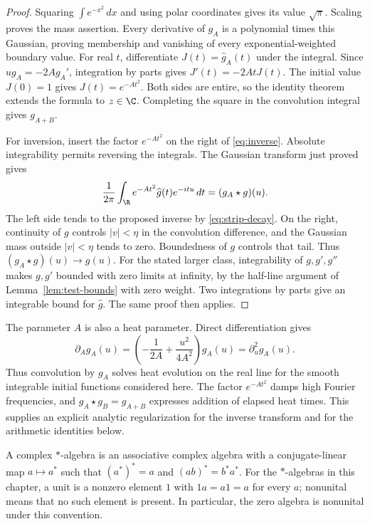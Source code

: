 \begin{proof}
Squaring $\int e^{-x^2}\,dx$ and using polar coordinates gives its value
$\sqrt\pi$.  Scaling proves the mass assertion.
Every derivative of $g_A$ is a polynomial times this Gaussian, proving
membership and vanishing of every exponential-weighted boundary value.
For real $t$, differentiate $J(t)=\widehat g_A(t)$ under the integral.
Since $u g_A=-2A g_A'$, integration by parts gives
$J'(t)=-2AtJ(t)$.  The initial value $J(0)=1$ gives $J(t)=e^{-At^2}$.
Both sides are entire, so the identity theorem extends the formula to $z\in\C$.
Completing the square in the convolution integral gives $g_{A+B}$.

For inversion, insert the factor $e^{-At^2}$ on the right of
\eqref{eq:inverse}.  Absolute integrability permits reversing the integrals.
The Gaussian transform just proved gives
\[
 \frac1{2\pi}\int_{\R}e^{-At^2}\widehat g(t)e^{-itu}\,dt
       =(g_A\star g)(u).
\]
The left side tends to the proposed inverse by \eqref{eq:strip-decay}.
On the right, continuity of $g$ controls $|v|<\eta$ in the convolution
difference, and the Gaussian mass outside $|v|<\eta$ tends to zero.
Boundedness of $g$ controls that tail.  Thus $(g_A\star g)(u)\to g(u)$.
For the stated larger class, integrability of $g,g',g''$ makes $g,g'$
bounded with zero limits at infinity, by the half-line argument of
Lemma~\ref{lem:test-bounds} with zero weight.
Two integrations by parts give an integrable bound for $\widehat g$.
The same proof then applies.
\end{proof}

The parameter $A$ is also a heat parameter.  Direct differentiation gives
\[
 \partial_A g_A(u)=\left(-\frac1{2A}+\frac{u^2}{4A^2}\right)g_A(u)
                  =\partial_u^2g_A(u).
\]
Thus convolution by $g_A$ solves heat evolution on the real line for the
smooth integrable initial functions considered here.
The factor $e^{-At^2}$ damps high Fourier frequencies, and
$g_A\star g_B=g_{A+B}$ expresses addition of elapsed heat times.
This supplies an explicit analytic regularization for the inverse transform
and for the arithmetic identities below.

A complex $*$-algebra is an associative complex algebra with a conjugate-linear
map $a\mapsto a^*$ such that $(a^*)^*=a$ and $(ab)^*=b^*a^*$.
For the $*$-algebras in this chapter, a unit is a nonzero element $1$
with $1a=a1=a$ for every $a$;
nonunital means that no such element is present.
In particular, the zero algebra is nonunital under this convention.

